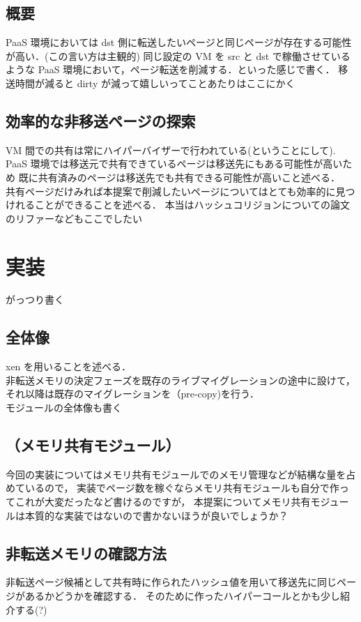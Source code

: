 \documentclass[graduation-thesis]{mlarticle}
\begin{document}
\subsection{概要}
\label{sec-4-1}
PaaS 環境においては dst 側に転送したいページと同じページが存在する可能性が高い．(この言い方は主観的)
同じ設定の VM を src と dst で稼働させているような 
PaaS 環境において，ページ転送を削減する．といった感じで書く．
移送時間が減ると dirty が減って嬉しいってことあたりはここにかく
\subsection{効率的な非移送ページの探索}
\label{sec-4-2}
VM 間での共有は常にハイパーバイザーで行われている(ということにして).
PaaS 環境では移送元で共有できているページは移送先にもある可能性が高いため
既に共有済みのページは移送先でも共有できる可能性が高いこと述べる．\\
   共有ページだけみれば本提案で削減したいページについてはとても効率的に見つけれることができることを述べる．
本当はハッシュコリジョンについての論文のリファーなどもここでしたい

\clearpage
\section{実装}
\label{sec-5}
がっつり書く
\subsection{全体像}
\label{sec-5-1}
xen を用いることを述べる．\\
   非転送メモリの決定フェーズを既存のライブマイグレーションの途中に設けて，
それ以降は既存のマイグレーションを（pre-copy)を行う．\\
   モジュールの全体像も書く
\subsection{（メモリ共有モジュール）}
\label{sec-5-2}
今回の実装についてはメモリ共有モジュールでのメモリ管理などが結構な量を占めているので，
実装でページ数を稼ぐならメモリ共有モジュールも自分で作ってこれが大変だったなど書けるのですが，
本提案についてメモリ共有モジュールは本質的な実装ではないので書かないほうが良いでしょうか？
\subsection{非転送メモリの確認方法}
\label{sec-5-3}
非転送ページ候補として共有時に作られたハッシュ値を用いて移送先に同じページがあるかどうかを確認する．
そのために作ったハイパーコールとかも少し紹介する(?)
\end{document}
